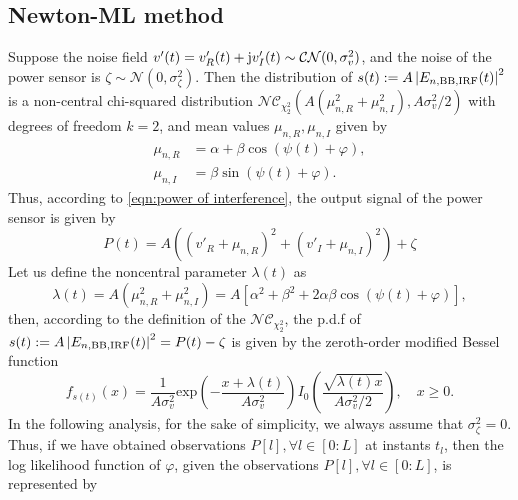 \documentclass[12pt,draftclsnofoot,journal,onecolumn]{IEEEtran}
\theoremstyle{nonumberplain}
\def \exp {\text{exp}}
\def \nc {\mathcal{NC}}
\begin{document}
\subsection{Newton-ML method}  \label{ML method}
    Suppose the noise field $v'(t)=v'_R(t) + {\rm j}v'_I(t)\sim \mathcal{CN}(0, \sigma_v^2)$, and the noise of the power sensor is $\zeta \sim \mathcal{N}(0, \sigma_{\zeta}^2)$. Then the distribution of $s(t) := A\left|E_{n, {\rm BB}, {\rm IRF}}(t)\right|^2$ is a non-central chi-squared distribution $\nc_{\chi_2^2}(A(\mu_{n,R}^2+\mu_{n,I}^2),  A\sigma_v^2/2)$ \cite{krishnan1967noncentral} with degrees of freedom $k=2$, and mean values $\mu_{n,R}, \mu_{n,I}$ given by
    \begin{subequations}
    \label{chi2 distribution mean values}
        \begin{align}
        \label{mu_n,R}
        \mu_{n,R} & = \alpha + \beta \cos(\psi(t)+\varphi),\\
        \label{mu_n,L}
        \mu_{n,I} & = \beta \sin(\psi(t)+\varphi).
        \end{align}
    \end{subequations}
    Thus, according to \eqref{eqn:power of interference}, the output signal of the power sensor is given by 
    \begin{equation}
        P(t)  = A\left((v'_{R} + \mu_{n,R})^2 + (v'_{I} + \mu_{n,I})^2 \right)+ \zeta 
        \label{eqn:sensor power}
    \end{equation}
    Let us define the noncentral parameter $\lambda(t)$ as
    \begin{equation}
        \lambda(t)  = A(\mu_{n,R}^2 + \mu_{n,I}^2) = A\left[\alpha^{2}+\beta^{2}+2\alpha\beta\cos\left(\psi(t)+\varphi\right)\right],
    \end{equation}
    then, according to the definition of the $\nc_{\chi_2^2}$, the p.d.f of $s(t)  := A\left|E_{n, {\rm BB}, {\rm IRF}}(t)\right|^2 = P(t)-\zeta$ is given by the zeroth-order modified Bessel function
    \begin{equation}
        f_{s(t)}(x) = \frac{1}{A\sigma_{v}^2} \exp\left(-\frac{x+\lambda(t)}{A\sigma_v^2}\right)I_{0}\left(\frac{\sqrt{\lambda(t) x}}{A\sigma_v^2/2}\right),\quad x \geq 0.
        \label{ML single observation}
    \end{equation}
    In the following analysis, for the sake of simplicity, we always assume that $\sigma_{\zeta}^2 = 0$. Thus, if we have obtained observations $P[l], \forall l\in [0:L]$ at instants $t_l$, then the log likelihood function of $\varphi$, given the observations $P[l], \forall l\in [0:L]$, is represented by
\end{document}
